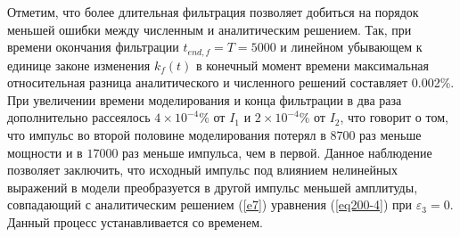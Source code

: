 \documentclass[14pt,a4paper]{extreport}
\begin{document}
			Отметим, что более длительная фильтрация позволяет добиться на порядок меньшей ошибки между численным и аналитическим решением. Так, при времени окончания фильтрации \(t_{end,f}=T=5000\) и линейном убывающем к единице законе изменения \(k_{f}\left(t\right)\) в конечный момент времени максимальная относительная разница аналитического и численного решений составляет 0.002\%. При увеличении времени моделирования и конца фильтрации в два раза дополнительно рассеялось \(4\times10^{-4}\%\) от \(I_{1}\) и \(2\times10^{-4}\%\) от \(I_{2}\), что говорит о том, что импульс во второй половине моделирования потерял в \(8700\) раз меньше мощности и в \(17000\) раз меньше импульса, чем в первой. Данное наблюдение позволяет заключить, что исходный импульс под влиянием нелинейных выражений в модели преобразуется в другой импульс меньшей амплитуды, совпадающий с аналитическим решением (\ref{e7}) уравнения (\ref{eq200-4}) при \(\varepsilon_{3}=0\). Данный процесс устанавливается со временем.
\end{document}
